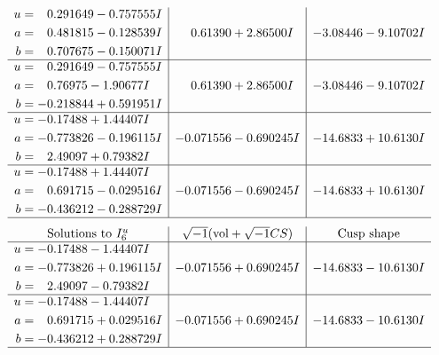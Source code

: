 \documentclass[1p]{elsarticle_modified}
\theoremstyle{definition}
\newcommand{\I}{\sqrt{-1}}
\begin{document}
$$\begin{array}{c|c|c}
\begin{aligned}
u &= \phantom{-}0.291649 - 0.757555 I \\
a &= \phantom{-}0.481815 - 0.128539 I \\
b &= \phantom{-}0.707675 - 0.150071 I\end{aligned}
 & \phantom{-}0.61390 + 2.86500 I & -3.08446 - 9.10702 I \\ \hline\begin{aligned}
u &= \phantom{-}0.291649 - 0.757555 I \\
a &= \phantom{-}0.76975 - 1.90677 I \\
b &= -0.218844 + 0.591951 I\end{aligned}
 & \phantom{-}0.61390 + 2.86500 I & -3.08446 - 9.10702 I \\ \hline\begin{aligned}
u &= -0.17488 + 1.44407 I \\
a &= -0.773826 - 0.196115 I \\
b &= \phantom{-}2.49097 + 0.79382 I\end{aligned}
 & -0.071556 - 0.690245 I & -14.6833 + 10.6130 I \\ \hline\begin{aligned}
u &= -0.17488 + 1.44407 I \\
a &= \phantom{-}0.691715 - 0.029516 I \\
b &= -0.436212 - 0.288729 I\end{aligned}
 & -0.071556 - 0.690245 I & -14.6833 + 10.6130 I\\
 \hline 
 \end{array}$$\newpage$$\begin{array}{c|c|c}  
\text{Solutions to }I^u_{6}& \I (\text{vol} + \sqrt{-1}CS) & \text{Cusp shape}\\
 \hline 
\begin{aligned}
u &= -0.17488 - 1.44407 I \\
a &= -0.773826 + 0.196115 I \\
b &= \phantom{-}2.49097 - 0.79382 I\end{aligned}
 & -0.071556 + 0.690245 I & -14.6833 - 10.6130 I \\ \hline\begin{aligned}
u &= -0.17488 - 1.44407 I \\
a &= \phantom{-}0.691715 + 0.029516 I \\
b &= -0.436212 + 0.288729 I\end{aligned}
 & -0.071556 + 0.690245 I & -14.6833 - 10.6130 I\\
 \hline 
 \end{array}$$\newpage\newpage\renewcommand{\arraystretch}{1}
\end{document}
